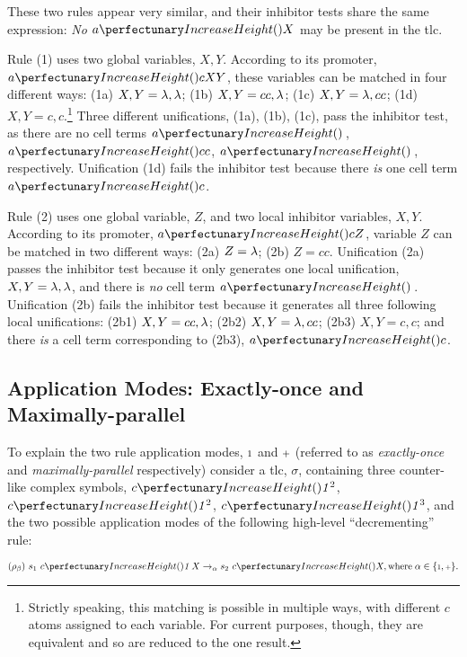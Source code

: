 These two rules appear very similar, and their \gls{inhibitor} tests share the same expression: 
\emph{No} \(\cpfunc{a}{X}\) may be present in the \gls{tlc}.

Rule (1) uses two global variables, \(X, Y\). 
According to its \gls{promoter}, \(\cpfunc{a}{cXY}\), these variables can be matched in four different ways:
(1a) \(X, Y = \lambda, \lambda\); (1b) \(X, Y = cc, \lambda\); (1c) \(X, Y = \lambda, cc\); (1d) \(X, Y = c, c\).\footnote{Strictly speaking, this matching is possible in multiple ways, with different \(c\) atoms assigned to each variable.  For current purposes, though, they are equivalent and so are reduced to the one result.}
Three different unifications, (1a), (1b), (1c), pass the \gls{inhibitor} test, 
as there are no cell terms \(\cpfunc{a}{\,}\), \(\cpfunc{a}{cc}\), \(\cpfunc{a}{\,}\), respectively. 
Unification (1d) fails the \gls{inhibitor} test because there \emph{is} one cell term \(\cpfunc{a}{c}\).

Rule (2) uses one global variable, \(Z\), and two local \gls{inhibitor} variables, \(X, Y\).
According to its \gls{promoter}, \(\cpfunc{a}{cZ}\), variable \(Z\) can be matched in two different ways: 
(2a) \(Z = \lambda\); (2b) \(Z = cc\).
Unification (2a) passes the \gls{inhibitor} test because it only generates one local unification,
\(X, Y = \lambda, \lambda\), and there is \emph{no} cell term \(\cpfunc{a}{\,}\).
Unification (2b) fails the \gls{inhibitor} test because it generates all three following local unifications:
(2b1) \(X, Y = cc, \lambda\); (2b2) \(X, Y = \lambda, cc\); (2b3) \(X, Y = c, c\); 
and there \emph{is} a cell term corresponding to (2b3), \(\cpfunc{a}{c}\).

\subsection{\label{sec:cps:applicationmodes}Application Modes: Exactly-once and Maximally-parallel}
To explain the two rule application modes, \({\scriptstyle 1}\) and \({\scriptstyle +}\) (referred to as \emph{exactly-once} and \emph{maximally-parallel} respectively) consider a \gls{tlc}, \(\sigma\), containing three counter-like complex symbols,
\(\cpfunc{c}{\cpundig^2}\), \(\cpfunc{c}{\cpundig^2}\), \(\cpfunc{c}{\cpundig^3}\),
and the two possible application modes of the following high-level ``decrementing'' rule:
\vspace{-0.2cm}
\begin{framed}
\vspace{-0.5cm}
\[(\rho_\beta) ~s_1 ~\cpfunc{c}{\cpundig \, X} \rightarrow_{\alpha} s_2 ~\cpfunc{c}{X},\\
\mathrm{where} \; \alpha \in \{\cponce, \cpmaxpar\}.\]
\vspace{-0.8cm}
\end{framed}

